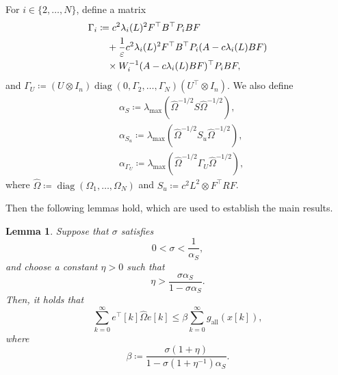 \documentclass[letterpaper,10pt,conference]{ieeeconf}
\newtheorem{lemma}{Lemma}
\DeclareMathOperator{\diag}{diag}
\begin{document}
For $i \in \{2,\dots,N\}$, define a matrix
\begin{align}
  \Gamma_i
  &\coloneqq c^2\lambda_i(L)^2 F^{\top}B^\top P_i BF \notag\\
  &\quad + \frac{1}{\varepsilon} c^2\lambda_i(L)^2
  F^{\top}B^\top P_i (A - c\lambda_i(L)BF) \notag\\
  &\quad \times W_i^{-1} (A - c\lambda_i(L)BF)^{\top} P_i BF,
\end{align}
and $ \Gamma_U \coloneqq (U \otimes I_n) \diag(0, \Gamma_2, \dots, \Gamma_N) (U^\top \otimes I_n)$.
We also define
\begin{align}
  &\alpha_S \coloneqq \lambda_{\max}\left(\hat\Omega^{-1/2} S \hat\Omega^{-1/2}\right), \\
  &\alpha_{S_u} \coloneqq \lambda_{\max}\left(\hat\Omega^{-1/2} S_u \hat\Omega^{-1/2}\right), \\
  &\alpha_{\Gamma_U} \coloneqq \lambda_{\max}\left(\hat\Omega^{-1/2} \Gamma_U \hat\Omega^{-1/2} \right),
\end{align}
where $\hat\Omega \coloneqq \diag(\Omega_1,\dots,\Omega_N)$ and $S_u \coloneqq c^2L^2\otimes F^\top RF$.

Then the following lemmas hold, which are used to establish the main results.

\begin{lemma} \label{lem:error_sum_bound}
  Suppose that $\sigma$ satisfies
  \begin{equation} \label{eq:sigma_condition1}
    0 < \sigma < \frac{1}{\alpha_S},
  \end{equation}
  and choose a constant $\eta > 0$ such that
  \begin{equation} \label{eq:eta_condition}
    \eta > \frac{\sigma \alpha_S}{1 - \sigma \alpha_S}.
  \end{equation}
  Then, it holds that
  \begin{equation}
    \sum_{k=0}^{\infty} e^\top[k] \hat\Omega e[k] \leq \beta \sum_{k=0}^{\infty} g_{\mathrm{all}}(x[k]),
  \end{equation}
  where
  \begin{equation} \label{eq:def_beta}
    \beta \coloneqq \frac{\sigma(1 + \eta)}{1 - \sigma(1 + \eta^{-1})\alpha_S}.
  \end{equation}
\end{lemma}
\end{document}
